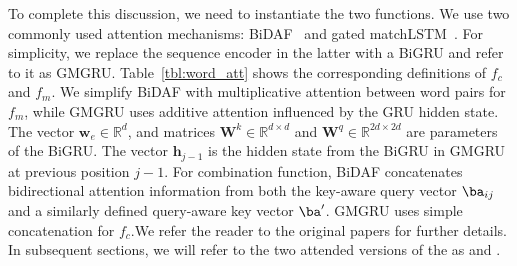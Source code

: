To complete this discussion, we need to instantiate the two
functions. We use two commonly used attention mechanisms:
BiDAF~\citep{bidaf} and gated matchLSTM~\citep{wang2017gated}. For
simplicity, we replace the sequence encoder in the latter with a BiGRU
and refer to it as GMGRU. Table~\ref{tbl:word_att} shows the
corresponding definitions of $f_{c}$ and $f_{m}$. We simplify BiDAF
with multiplicative attention between word pairs for $f_{m}$, while
GMGRU uses additive attention influenced by the GRU hidden state.  The
vector $\bm{w}_{e} \in\mathbb{R}^{d}$, and matrices
$\bm{W}^{k}\in \mathbb{R}^{d \times d}$ and
$\bm{W}^{q} \in\mathbb{R}^{2d \times 2d}$ are parameters of the BiGRU. The
vector $\bm{h}_{j-1}$ is the hidden state from the BiGRU in GMGRU at
previous position $j-1$.  For combination function, BiDAF concatenates
bidirectional attention information from both the key-aware query
vector $\ba_{ij}$ and a similarly defined query-aware key vector
$\ba^{\prime}$. GMGRU uses simple concatenation for $f_c$.We refer the
reader to the original papers for further details. In subsequent
sections, we will refer to the two attended versions of the \HGRU as
\BiDAFH and \GMGRUH.



